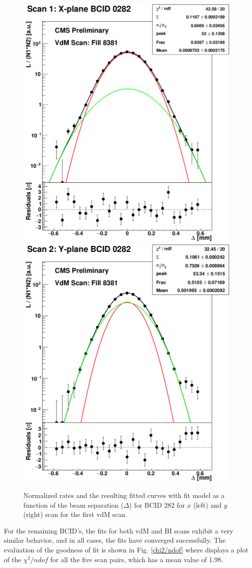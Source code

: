 \begin{center}
\begin{figure}[h!]
\centering
\includegraphics[width=.45\textwidth]{Chapter4/xscan.png}
\includegraphics[width=.45\textwidth]{Chapter4/yscan.png}\\
\caption[Fit for the vdM1 BCIDs 282 (x and y directions)]{Normalized rates and the resulting fitted curves with  fit model as a function of the beam separation ($\Delta$) for BCID 282 for $x$ (left) and $y$ (right) scan for the first vdM scan.}
\label{vdM1_282_XYscan}
\end{figure}
\end{center}
For the remaining BCID's, the fits for both vdM and BI scans exhibit a very similar behavior, and in all cases, the fits have converged successfully. The evaluation of the goodness of fit is shown in Fig. \ref{chi2/ndof} where displays a plot of the $\chi^{2}/ndof$ for all the five scan pairs, which has a mean value of 1.98.

